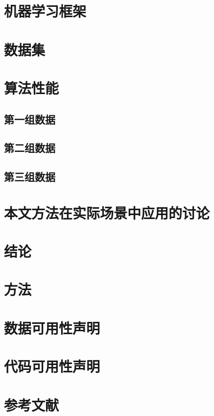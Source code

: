 \documentclass{article}
\begin{document}
\section{机器学习框架}

\section{数据集}

\section{算法性能}

\subsection{第一组数据}

\subsection{第二组数据}

\subsection{第三组数据}

\section{本文方法在实际场景中应用的讨论}

\section{结论}

\section{方法}

\section{数据可用性声明}

\section{代码可用性声明}

\section{参考文献}
\end{document}
